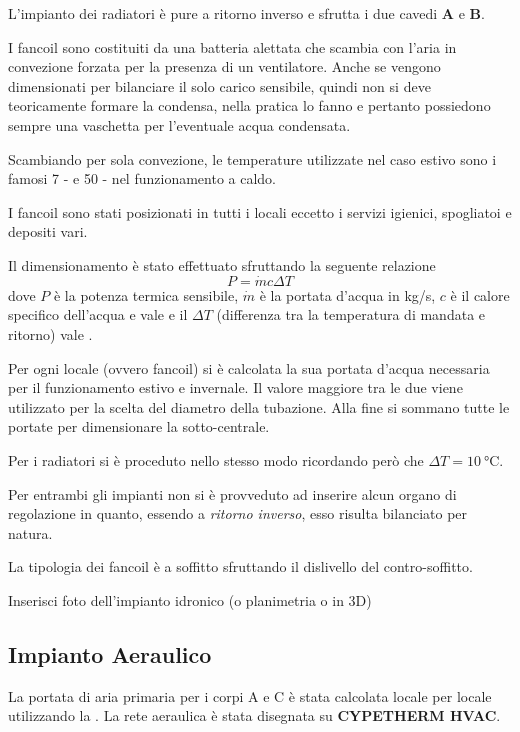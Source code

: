 L'impianto dei radiatori è pure a ritorno inverso e sfrutta i due cavedi \textbf{A} e \textbf{B}. 

I fancoil sono costituiti da una batteria alettata che scambia con l'aria in convezione forzata per la presenza di un ventilatore. Anche se vengono dimensionati per bilanciare il solo carico sensibile, quindi non si deve teoricamente formare la condensa, nella pratica lo fanno e pertanto possiedono sempre una vaschetta per l'eventuale acqua condensata. 

Scambiando per sola convezione, le temperature utilizzate nel caso estivo sono i famosi \num{7} -  e \num{50} -  nel funzionamento a caldo. 

I fancoil sono stati posizionati in tutti i locali eccetto i servizi igienici, spogliatoi e depositi vari.

Il dimensionamento è stato effettuato sfruttando la seguente relazione
\begin{equation}
	P=\dot{m}c\Delta T
\end{equation}
dove $P$ è la potenza termica sensibile, $\dot{m}$ è la portata d'acqua in \si{kg/s}, $c$ è il calore specifico dell'acqua e vale  e il $\Delta T$ (differenza tra la temperatura di mandata e ritorno) vale .

Per ogni locale (ovvero fancoil) si è calcolata la sua portata d'acqua necessaria per il funzionamento estivo e invernale. Il valore maggiore tra le due viene utilizzato per la scelta del diametro della tubazione. Alla fine si sommano tutte le portate per dimensionare la sotto-centrale. 

Per i radiatori si è proceduto nello stesso modo ricordando però che $\Delta T=\SI{10}{\degreeCelsius}$.

Per entrambi gli impianti non si è provveduto ad inserire alcun organo di regolazione in quanto, essendo a \emph{ritorno inverso}, esso risulta bilanciato per natura. 

La tipologia dei fancoil è a soffitto sfruttando il dislivello del contro-soffitto.

Inserisci foto dell'impianto idronico (o planimetria o in 3D)
\subsection{Impianto Aeraulico}
La portata di aria primaria per i corpi A e C è stata calcolata locale per locale utilizzando la \norvent. La rete aeraulica è stata disegnata su \textbf{CYPETHERM HVAC}. 

